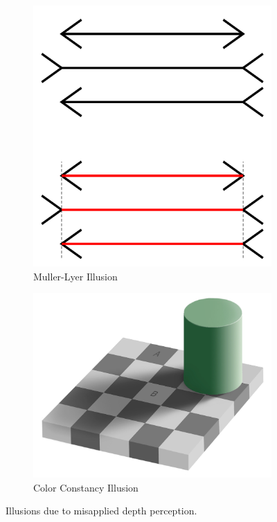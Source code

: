 \documentclass[11pt]{isuthesis}\usepackage[]{graphicx}\usepackage[]{color}
\begin{document}
\begin{figure}[htbp]
\hfil
\begin{subfigure}[b]{.4\textwidth}\centering
  \includegraphics[width=\textwidth, angle=90]{MullerLyer}
  \caption{Muller-Lyer Illusion}\label{fig:MullerLyer}
\end{subfigure}\hfill
\begin{subfigure}[b]{.4\textwidth}\centering
  \includegraphics[width=\textwidth]{CheckerShadow}
  \caption{Color Constancy Illusion}\label{fig:ColorConstancy}
\end{subfigure}\hfil

\caption[Depth Illusions]{Illusions due to misapplied depth perception.}\label{fig:DepthIllusions}
\end{figure}
\end{document}
